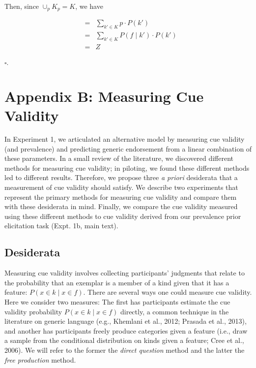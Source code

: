 \documentclass[english,,man,floatsintext]{apa6}
\theoremstyle{definition}
\theoremstyle{definition}
\theoremstyle{definition}
\theoremstyle{remark}
\begin{document}
Then, since \(\cup_{p}{K_p} = K\), we have

\begin{eqnarray} \label{eq:partition}
  & = & \sum\limits_{k' \in K} p \cdot P( k') \nonumber \\ 
  & = & \sum\limits_{k' \in K} P(f \mid k') \cdot P( k') \nonumber \\ 
  & = & Z
\end{eqnarray}

\(\square.\)

\newpage

\hypertarget{appendix-b-measuring-cue-validity}{%
\section{Appendix B: Measuring Cue
Validity}\label{appendix-b-measuring-cue-validity}}

In Experiment 1, we articulated an alternative model by measuring cue
validity (and prevalence) and predicting generic endorsement from a
linear combination of these parameters. In a small review of the
literature, we discovered different methods for measuring cue validity;
in piloting, we found these different methods led to different results.
Therefore, we propose three \emph{a priori} desiderata that a
measurement of cue validity should satisfy. We describe two experiments
that represent the primary methods for measuring cue validity and
compare them with these desiderata in mind. Finally, we compare the cue
validity measured using these different methods to cue validity derived
from our prevalence prior elicitation task (Expt. 1b, main text).

\hypertarget{desiderata}{%
\subsection{Desiderata}\label{desiderata}}

Measuring cue validity involves collecting participants' judgments that
relate to the probability that an exemplar is a member of a kind given
that it has a feature: \(P(x \in k \mid x \in f)\). There are several
ways one could measure cue validity. Here we consider two measures: The
first has participants estimate the cue validity probability
\(P(x \in k \mid x \in f)\) directly, a common technique in the
literature on generic language (e.g., Khemlani et al., 2012; Prasada et
al., 2013), and another has participants freely produce categories given
a feature (i.e., draw a sample from the conditional distribution on
kinds given a feature; Cree et al., 2006). We will refer to the former
the \emph{direct question} method and the latter the \emph{free
production} method.
\end{document}
